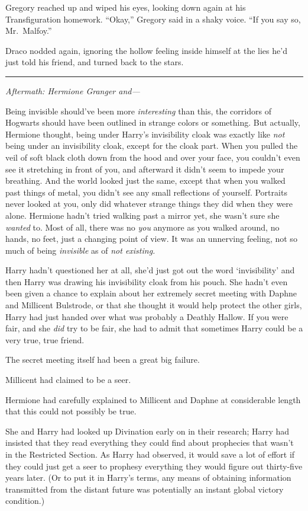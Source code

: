 Gregory reached up and wiped his eyes, looking down again at his
Transfiguration homework. ``Okay,'' Gregory said in a shaky voice. ``If
you say so, Mr.~Malfoy.''

Draco nodded again, ignoring the hollow feeling inside himself at the
lies he'd just told his friend, and turned back to the stars.

\begin{center}\rule{3in}{0.4pt}\end{center}

\emph{Aftermath: Hermione Granger and---}

Being invisible should've been more \emph{interesting} than this, the
corridors of Hogwarts should have been outlined in strange colors or
something. But actually, Hermione thought, being under Harry's
invisibility cloak was exactly like \emph{not} being under an
invisibility cloak, except for the cloak part. When you pulled the veil
of soft black cloth down from the hood and over your face, you couldn't
even see it stretching in front of you, and afterward it didn't seem to
impede your breathing. And the world looked just the same, except that
when you walked past things of metal, you didn't see any small
reflections of yourself. Portraits never looked at you, only did
whatever strange things they did when they were alone. Hermione hadn't
tried walking past a mirror yet, she wasn't sure she \emph{wanted} to.
Most of all, there was no \emph{you} anymore as you walked around, no
hands, no feet, just a changing point of view. It was an unnerving
feeling, not so much of being \emph{invisible} as of \emph{not
existing.}

Harry hadn't questioned her at all, she'd just got out the word
`invisibility' and then Harry was drawing his invisibility cloak from
his pouch. She hadn't even been given a chance to explain about her
extremely secret meeting with Daphne and Millicent Bulstrode, or that
she thought it would help protect the other girls, Harry had just handed
over what was probably a Deathly Hallow. If you were fair, and she
\emph{did} try to be fair, she had to admit that sometimes Harry could
be a very true, true friend.

The secret meeting itself had been a great big failure.

Millicent had claimed to be a seer.

Hermione had carefully explained to Millicent and Daphne at considerable
length that this could not possibly be true.

She and Harry had looked up Divination early on in their research; Harry
had insisted that they read everything they could find about prophecies
that wasn't in the Restricted Section. As Harry had observed, it would
save a lot of effort if they could just get a seer to prophesy
everything they would figure out thirty-five years later. (Or to put it
in Harry's terms, any means of obtaining information transmitted from
the distant future was potentially an instant global victory condition.)

